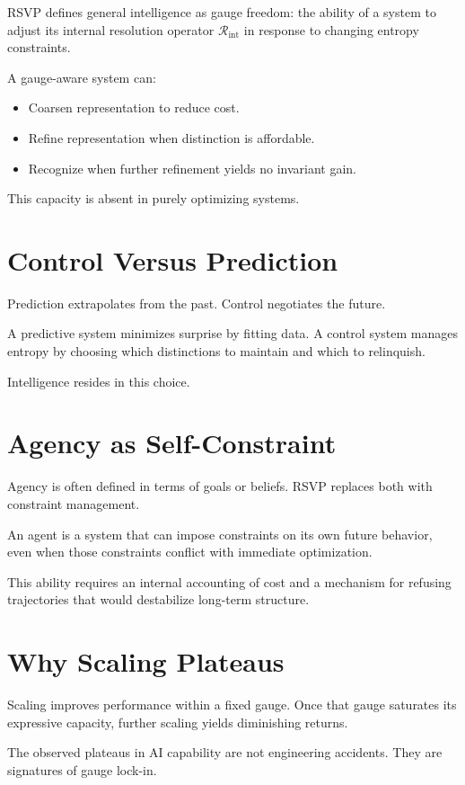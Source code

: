 \documentclass[11pt]{book}
\begin{document}
RSVP defines general intelligence as gauge freedom: the ability of a system to adjust its internal resolution operator \(\mathcal{R}_{\text{int}}\) in response to changing entropy constraints.

A gauge-aware system can:
\begin{itemize}
\item Coarsen representation to reduce cost.
\item Refine representation when distinction is affordable.
\item Recognize when further refinement yields no invariant gain.
\end{itemize}

This capacity is absent in purely optimizing systems.

\section{Control Versus Prediction}

Prediction extrapolates from the past. Control negotiates the future.

A predictive system minimizes surprise by fitting data. A control system manages entropy by choosing which distinctions to maintain and which to relinquish.

Intelligence resides in this choice.

\section{Agency as Self-Constraint}

Agency is often defined in terms of goals or beliefs. RSVP replaces both with constraint management.

An agent is a system that can impose constraints on its own future behavior, even when those constraints conflict with immediate optimization.

This ability requires an internal accounting of cost and a mechanism for refusing trajectories that would destabilize long-term structure.

\section{Why Scaling Plateaus}

Scaling improves performance within a fixed gauge. Once that gauge saturates its expressive capacity, further scaling yields diminishing returns.

The observed plateaus in AI capability are not engineering accidents. They are signatures of gauge lock-in.
\end{document}
